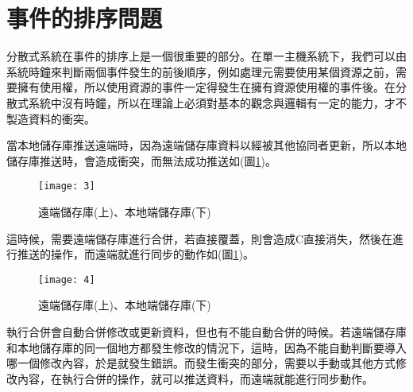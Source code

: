 \section{事件的排序問題}
\par
\renewcommand{\baselinestretch}{1} %
\twelve \qquad 分散式系統在事件的排序上是一個很重要的部分。在單一主機系統下，我們可以由系統時鐘來判斷兩個事件發生的前後順序，例如處理元需要使用某個資源之前，需要擁有使用權，所以使用資源的事件一定得發生在擁有資源使用權的事件後。在分散式系統中沒有時鐘，所以在理論上必須對基本的觀念與邏輯有一定的能力，才不製造資料的衝突。
\\
\par
\renewcommand{\baselinestretch}{1} %
\twelve \hspace{0.5em} 當本地儲存庫推送遠端時，因為遠端儲存庫資料以經被其他協同者更新，所以本地儲存庫推送時，會造成衝突，而無法成功推送如(圖\ref{fig.衝突})。
\\
\par
\renewcommand{\baselinestretch}{1.7} %
\begin{figure}[hbt!]
\begin{center}
\texttt{[image: 3]}
\caption{\large 遠端儲存庫(上)、本地端儲存庫(下)}\label{fig.衝突}
\end{center}
\end{figure}
\par
\renewcommand{\baselinestretch}{1} %
\twelve \hspace{0.5em} 這時候，需要遠端儲存庫進行合併，若直接覆蓋，則會造成C直接消失，然後在進行推送的操作，而遠端就進行同步的動作如(圖\ref{fig.衝突})。
\\
\par
\renewcommand{\baselinestretch}{1.7} %
\begin{figure}[hbt!]
\begin{center}
\texttt{[image: 4]}
\caption{\large 遠端儲存庫(上)、本地端儲存庫(下)}\label{fig.解決衝突}
\end{center}
\end{figure}
\par
\renewcommand{\baselinestretch}{1} %
\twelve \hspace{0.5em} 執行合併會自動合併修改或更新資料，但也有不能自動合併的時候。若遠端儲存庫和本地儲存庫的同一個地方都發生修改的情況下，這時，因為不能自動判斷要導入哪一個修改內容，於是就發生錯誤。而發生衝突的部分，需要以手動或其他方式修改內容，在執行合併的操作，就可以推送資料，而遠端就能進行同步動作。
\par